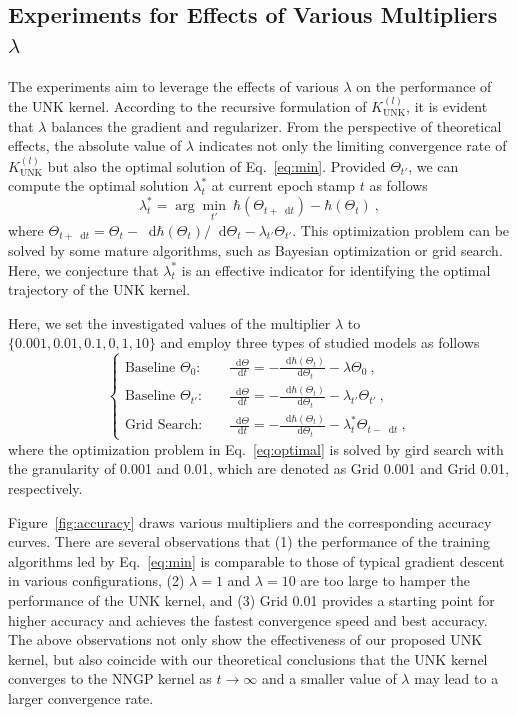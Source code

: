 \documentclass[review,10pt]{JMtemplate}
\newcommand*{\dif}{\mathop{}\!\mathrm{d}}
\begin{document}
\subsection{Experiments for Effects of Various Multipliers $\lambda$}  \label{subsec:experiment_lamda}
The experiments aim to leverage the effects of various $\lambda$ on the performance of the UNK kernel. According to the recursive formulation of $K_{\textrm{UNK}}^{(l)}$, it is evident that $\lambda$ balances the gradient and regularizer. From the perspective of theoretical effects, the absolute value of $\lambda$ indicates not only the limiting convergence rate of $K_{\textrm{UNK}}^{(l)}$ but also the optimal solution of Eq.~\eqref{eq:min}. Provided $\Theta_{t'}$, we can compute the optimal solution $\lambda^*_{t}$ at current epoch stamp $t$ as follows
\begin{equation}  \label{eq:optimal}
    \lambda^*_t = \arg\min_{t'} ~ \hbar(\Theta_{t+\dif t}) - \hbar(\Theta_t) \ ,
\end{equation}
where $\Theta_{t+ \dif t} = \Theta_t  - {\dif \hbar(\Theta_t)}/{\dif \Theta_t} - \lambda_{t'} \Theta_{t'}$. This optimization problem can be solved by some mature algorithms, such as Bayesian optimization or grid search. Here, we conjecture that $\lambda^*_t$ is an effective indicator for identifying the optimal trajectory of the UNK kernel.

Here, we set the investigated values of the multiplier $\lambda$ to $\{0.001, 0.01, 0.1, 0, 1, 10\}$ and employ three types of studied models as follows
\[
\left\{\begin{aligned}
\textrm{Baseline $\Theta_0$}:&\quad  \frac{\dif \Theta}{\dif t} =  -  \frac{\dif \hbar(\Theta_t)}{\dif \Theta_t} - \lambda \Theta_0 \ ,   \\
\textrm{Baseline $\Theta_{t'}$}:&\quad  \frac{\dif \Theta}{\dif t} =  -  \frac{\dif \hbar(\Theta_t)}{\dif \Theta_t} - \lambda_{t'} \Theta_{t'} \ ,   \\
\textrm{Grid Search}:&\quad  \frac{\dif \Theta}{\dif t} =  -  \frac{\dif \hbar(\Theta_t)}{\dif \Theta_t} - \lambda^*_t \Theta_{t-\dif t} \ ,
\end{aligned}\right.
\]
where the optimization problem in Eq.~\eqref{eq:optimal} is solved by gird search with the granularity of 0.001 and 0.01, which are denoted as Grid 0.001 and Grid 0.01, respectively. 

Figure~\ref{fig:accuracy} draws various multipliers and the corresponding accuracy curves. There are several observations that (1) the performance of the training algorithms led by Eq.~\eqref{eq:min} is comparable to those of typical gradient descent in various configurations, (2) $\lambda=1$ and $\lambda=10$ are too large to hamper the performance of the UNK kernel, and (3) Grid 0.01 provides a starting point for higher accuracy and achieves the fastest convergence speed and best accuracy. The above observations not only show the effectiveness of our proposed UNK kernel, but also coincide with our theoretical conclusions that the UNK kernel converges to the NNGP kernel as $t \to \infty$ and a smaller value of $\lambda$ may lead to a larger convergence rate.
\end{document}
